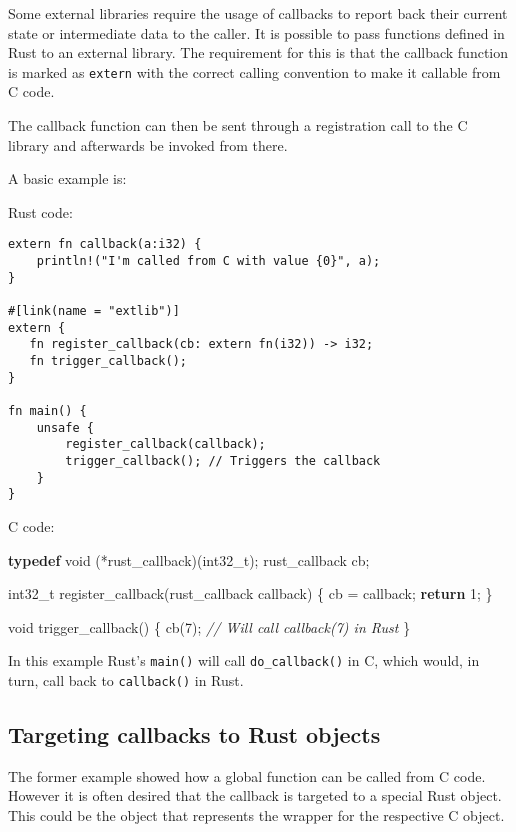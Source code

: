 \documentclass[]{article}
\newenvironment{Shaded}{}{}
\newcommand{\KeywordTok}[1]{\textcolor[rgb]{0.00,0.44,0.13}{\textbf{{#1}}}}
\newcommand{\DataTypeTok}[1]{\textcolor[rgb]{0.56,0.13,0.00}{{#1}}}
\newcommand{\DecValTok}[1]{\textcolor[rgb]{0.25,0.63,0.44}{{#1}}}
\newcommand{\CommentTok}[1]{\textcolor[rgb]{0.38,0.63,0.69}{\textit{{#1}}}}
\newcommand{\NormalTok}[1]{{#1}}
\begin{document}
Some external libraries require the usage of callbacks to report back
their current state or intermediate data to the caller. It is possible
to pass functions defined in Rust to an external library. The
requirement for this is that the callback function is marked as
\texttt{extern} with the correct calling convention to make it callable
from C code.

The callback function can then be sent through a registration call to
the C library and afterwards be invoked from there.

A basic example is:

Rust code:

\begin{verbatim}
extern fn callback(a:i32) {
    println!("I'm called from C with value {0}", a);
}

#[link(name = "extlib")]
extern {
   fn register_callback(cb: extern fn(i32)) -> i32;
   fn trigger_callback();
}

fn main() {
    unsafe {
        register_callback(callback);
        trigger_callback(); // Triggers the callback
    }
}
\end{verbatim}

C code:

\begin{Shaded}
\begin{Highlighting}[]
\KeywordTok{typedef} \DataTypeTok{void} \NormalTok{(*rust_callback)(}\DataTypeTok{int32_t}\NormalTok{);}
\NormalTok{rust_callback cb;}

\DataTypeTok{int32_t} \NormalTok{register_callback(rust_callback callback) \{}
    \NormalTok{cb = callback;}
    \KeywordTok{return} \DecValTok{1}\NormalTok{;}
\NormalTok{\}}

\DataTypeTok{void} \NormalTok{trigger_callback() \{}
  \NormalTok{cb(}\DecValTok{7}\NormalTok{); }\CommentTok{// Will call callback(7) in Rust}
\NormalTok{\}}
\end{Highlighting}
\end{Shaded}

In this example Rust's \texttt{main()} will call \texttt{do\_callback()}
in C, which would, in turn, call back to \texttt{callback()} in Rust.

\subsection{Targeting callbacks to Rust
objects}\label{targeting-callbacks-to-rust-objects}

The former example showed how a global function can be called from C
code. However it is often desired that the callback is targeted to a
special Rust object. This could be the object that represents the
wrapper for the respective C object.
\end{document}
